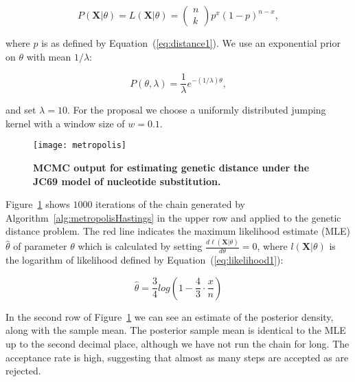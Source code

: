 \begin{equation}
P\left(\mathbf{X}|\theta\right)=L\left(\mathbf{X}|\theta\right)=\left(\begin{array}{c}
n\\
k
\end{array}\right)p^{x}(1-p)^{n-x},
\label{eq:likelihood1}
\end{equation}

\noindent
where $p$ is as defined by Equation~(\ref{eq:distance1}).
We use an exponential prior on $\theta$ with mean $1/\lambda$:

\begin{equation}
P\left(\theta,\lambda\right)=\frac{1}{\lambda}e^{-(1/\lambda)\theta},
\label{eq:expPrior}
\end{equation}

\noindent
and set $\lambda=10$.
For the proposal we choose a uniformly distributed jumping kernel with a window size of $w=0.1$.

\begin{figure}[H]
\centering
\texttt{[image: metropolis]} 
\caption{
{ \footnotesize 
{\bf MCMC output for estimating genetic distance under the JC69 model of nucleotide substitution.
} 
}%
}
\label{fig:metropolis}
\end{figure}

Figure~\ref{fig:metropolis} shows $1000$ iterations of the chain generated by Algorithm~\ref{alg:metropolisHastings} in the upper row and applied to the genetic distance problem.
The red line 
indicates the maximum likelihood estimate (MLE) $\hat{\theta}$ of parameter $\theta$ which is calculated by setting $\frac{d\ell\left(\mathbf{X}|\theta\right)}{d\theta}=0$, where $l\left(\mathbf{X}|\theta\right)$ is the logarithm of likelihood defined by Equation~(\ref{eq:likelihood1}):

\begin{equation}
\hat{\theta}=\frac{3}{4}log\left(1-\frac{4}{3}\cdot\frac{x}{n}\right)
\label{eq:mle}
\end{equation}

In the second row of Figure~\ref{fig:metropolis} we can see an estimate of the posterior density, along with the sample mean.
The posterior sample mean is identical to the MLE up to the second decimal place, although we have not run the chain for long.
The acceptance rate is high, suggesting that almost as many steps are accepted as are rejected.

